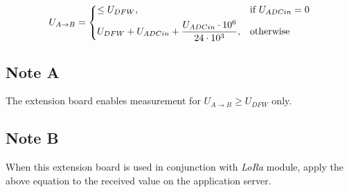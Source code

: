 \documentclass[twoside,a4paper]{refart}
\begin{document}
\[
   U_{A \rightarrow B} = 
   \begin{dcases}
     \leq U_{DFW}, & \text{if } U_{ADCin} = 0\\
     U_{DFW} + U_{ADCin} + \frac{U_{ADCin} \cdot 10^6}{24 \cdot 10^3}, & \text{otherwise}
   \end{dcases}
\]

\subsection*{Note A}
  The extension board enables measurement for $U_{A \rightarrow B} \geq U_{DFW}$ only.

\subsection*{Note B}
  When this extension board is used in conjunction with {\it LoRa} module, apply the above equation to the received value on the application server.

  

\clearpage





\end{document}
